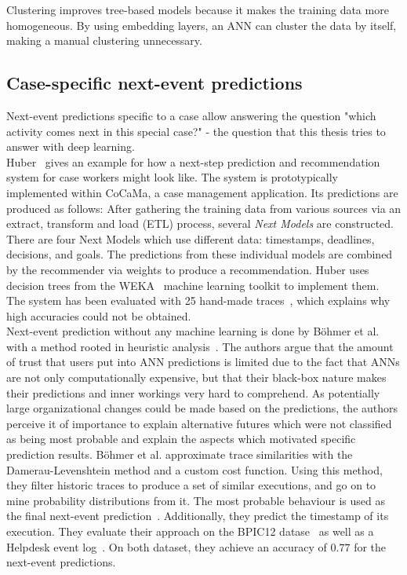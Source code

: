 Clustering improves tree-based models because it makes the training data more homogeneous. By using embedding layers, an ANN can cluster the data by itself, making a manual clustering unnecessary.

\subsection*{Case-specific next-event predictions}
Next-event predictions specific to a case allow answering the question "which activity comes next in this special case?" - the question that this thesis tries to answer with deep learning.\\

Huber~\cite{huber2015} gives an example for how a next-step prediction and recommendation system for case workers might look like. The system is prototypically implemented within CoCaMa, a case management application. Its predictions are produced as follows: After gathering the training data from various sources via an extract, transform and load (ETL) process, several \textit{Next Models} are constructed. There are four Next Models which use different data: timestamps, deadlines, decisions, and goals. The predictions from these individual models are combined by the recommender via weights to produce a recommendation. Huber uses decision trees from the WEKA~\cite{web:weka} machine learning toolkit to implement them. The system has been evaluated with 25 hand-made traces~\cite{huber2015}, which explains why high accuracies could not be obtained.\\

Next-event prediction without any machine learning is done by Böhmer et al. with a method rooted in heuristic analysis~\cite{boehmer2018probability}. The authors argue that the amount of trust that users put into ANN predictions is limited due to the fact that ANNs are not only computationally expensive, but that their black-box nature makes their predictions and inner workings very hard to comprehend. As potentially large organizational changes could be made based on the predictions, the authors perceive it of importance to explain alternative futures which were not classified as being most probable and explain the aspects which motivated specific prediction results.
Böhmer et al. approximate trace similarities with the Damerau-Levenshtein method and a custom cost function. Using this method, they filter historic traces to produce a set of similar executions, and go on to mine probability distributions from it. The most probable behaviour is used as the final next-event prediction~\cite{boehmer2018probability}. Additionally, they predict the timestamp of its execution. They evaluate their approach on the BPIC12 datase~\cite{BPIC2012} as well as a Helpdesk event log~\cite{Helpdesk}. On both dataset, they achieve an accuracy of $0.77$ for the next-event predictions.

